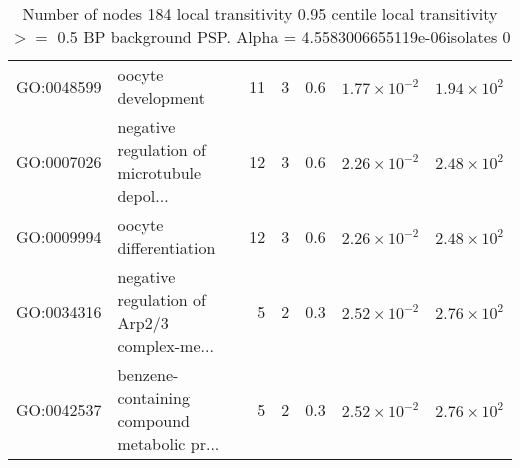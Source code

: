 \begin{table}[ht]
\begin{adjustbox}{max width=\textwidth}
\begin{tabular}{llrrrrr}
  GO:0048599 & oocyte development & 11 & 3 & 0.6 & $1.77 \times 10^{-2}$ & $1.94 \times 10^{2}$ \\ 
  GO:0007026 & negative regulation of microtubule depol... & 12 & 3 & 0.6 & $2.26 \times 10^{-2}$ & $2.48 \times 10^{2}$ \\ 
  GO:0009994 & oocyte differentiation & 12 & 3 & 0.6 & $2.26 \times 10^{-2}$ & $2.48 \times 10^{2}$ \\ 
  GO:0034316 & negative regulation of Arp2/3 complex-me... & 5 & 2 & 0.3 & $2.52 \times 10^{-2}$ & $2.76 \times 10^{2}$ \\ 
  GO:0042537 & benzene-containing compound metabolic pr... & 5 & 2 & 0.3 & $2.52 \times 10^{-2}$ & $2.76 \times 10^{2}$ \\ 
   \hline
\end{tabular}
\end{adjustbox}
\caption{Number of nodes 184 local transitivity 0.95 centile  local transitivity $>=$ 0.5 BP background PSP. Alpha = 4.5583006655119e-06isolates 0} 
\label{tab:Number of nodes 184 local transitivity 0.95 centile  local transitivity $>=$ 0.5 BP background PSP. Alpha = 4.5583006655119e-06isolates 0}
\end{table}



